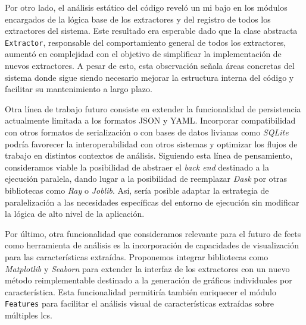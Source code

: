 Por otro lado, el análisis estático del código reveló un \gls{mi} bajo en los módulos encargados de la lógica base de los extractores y del registro de todos los extractores del sistema. Este resultado era esperable dado que la clase abstracta \texttt{Extractor}, responsable del comportamiento general de todos los extractores, aumentó en complejidad con el objetivo de simplificar la implementación de nuevos extractores. A pesar de esto, esta observación señala áreas concretas del sistema donde sigue siendo necesario mejorar la estructura interna del código y facilitar su mantenimiento a largo plazo.

Otra línea de trabajo futuro consiste en extender la funcionalidad de persistencia actualmente limitada a los formatos JSON y YAML. Incorporar compatibilidad con otros formatos de serialización o con bases de datos livianas como \textit{SQLite} podría favorecer la interoperabilidad con otros sistemas y optimizar los flujos de trabajo en distintos contextos de análisis. Siguiendo esta línea de pensamiento, consideramos viable la posibilidad de abstraer el \emph{back end} destinado a la ejecución paralela, dando lugar a la posibilidad de reemplazar \textit{Dask} por otras bibliotecas como \textit{Ray} o \textit{Joblib}. Así, sería posible adaptar la estrategia de paralelización a las necesidades específicas del entorno de ejecución sin modificar la lógica de alto nivel de la aplicación.

Por último, otra funcionalidad que consideramos relevante para el futuro de \gls{feets} como herramienta de análisis es la incorporación de capacidades de visualización para las características extraídas. Proponemos integrar bibliotecas como \textit{Matplotlib} y \textit{Seaborn} para extender la interfaz de los extractores con un nuevo método reimplementable destinado a la generación de gráficos individuales por característica. Esta funcionalidad permitiría también enriquecer el módulo \texttt{Features} para facilitar el análisis visual de características extraídas sobre múltiples \glspl{lc}.


